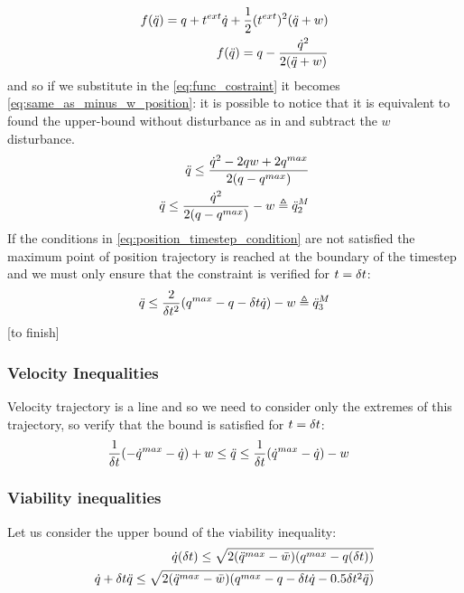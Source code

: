 \documentclass{article}
\begin{document}
\begin{equation}
    \begin{aligned}
    f(\ddot{q}) = q+t^{ext}\dot{q}+\frac{1}{2}(t^{ext})^2(\ddot{q}+w) \\
    f(\ddot{q}) = q-\frac{\dot{q}^2}{2(\ddot{q}+w)}
    \end{aligned}
\end{equation}
and so if we substitute in the \ref{eq:func_costraint} it becomes \ref{eq:same_as_minus_w_position}: it is possible to notice that it is equivalent to found the upper-bound without disturbance as in \cite{DelPrete2018} and subtract the $w$ disturbance.  
\begin{equation}
    \begin{aligned}
    \ddot{q} \leq \frac{\dot{q}^2-2qw+2q^{max}}{2(q-q^{max})} \\
    \ddot{q} \leq \frac{\dot{q}^2}{2(q-q^{max})}-w \triangleq \ddot{q}^M_2
    \end{aligned}
    \label{eq:same_as_minus_w_position}
\end{equation}
If the conditions in \ref{eq:position_timestep_condition} are not satisfied the maximum point of position trajectory is reached at the boundary of the timestep and we must only ensure that the constraint is verified for $t=\delta t$:
\begin{equation}
    \ddot{q} \leq \frac{2}{\delta t^2}(q^{max}-q-\delta t \dot{q}) -w \triangleq \ddot{q}^M_3
\end{equation}
[to finish]
\subsubsection*{Velocity Inequalities}
Velocity trajectory is a line and so we need to consider only the extremes of this trajectory, so verify that the bound is satisfied for $t=\delta t$:
\begin{equation} \label{eq:vel_ineq} \begin{aligned} 
\frac{1}{\delta t} (- \dot{q}^{max} - \dot{q})+w \le \ddot{q} &\le \frac{1}{\delta t} (\dot{q}^{max} - \dot{q})-w
\end{aligned} \end{equation}
\subsubsection*{Viability inequalities}
Let us consider the upper bound of the viability inequality:
\begin{equation} \begin{aligned} 
    \dot{q}(\delta t) \leq \sqrt{2 (\ddot{q}^{max}-\bar{w}) (q^{max} - q(\delta t))} \\
   \dot{q}+\delta t\ddot{q} \leq \sqrt{2 (\ddot{q}^{max}-\bar{w}) (q^{max} - q-\delta t\dot{q}-0.5\delta t^2\ddot{q})}
    \end{aligned} 
\end{equation} 
\end{document}
